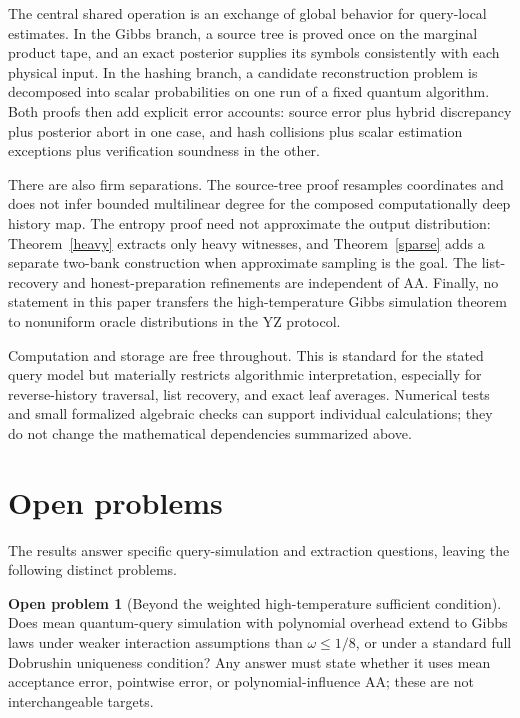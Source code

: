 \documentclass[11pt]{article}
\theoremstyle{definition}\newtheorem{definition}[theorem]{Definition}
\newtheorem{problem}[theorem]{Open problem}
\theoremstyle{remark}\newtheorem{remark}[theorem]{Remark}
\begin{document}
The central shared operation is an exchange of global behavior for query-local estimates. In the Gibbs branch, a source tree is proved once on the marginal product tape, and an exact posterior supplies its symbols consistently with each physical input. In the hashing branch, a candidate reconstruction problem is decomposed into scalar probabilities on one run of a fixed quantum algorithm. Both proofs then add explicit error accounts: source error plus hybrid discrepancy plus posterior abort in one case, and hash collisions plus scalar estimation exceptions plus verification soundness in the other.

There are also firm separations. The source-tree proof resamples coordinates and does not infer bounded multilinear degree for the composed computationally deep history map. The entropy proof need not approximate the output distribution: Theorem~\ref{heavy} extracts only heavy witnesses, and Theorem~\ref{sparse} adds a separate two-bank construction when approximate sampling is the goal. The list-recovery and honest-preparation refinements are independent of AA. Finally, no statement in this paper transfers the high-temperature Gibbs simulation theorem to nonuniform oracle distributions in the YZ protocol.

Computation and storage are free throughout. This is standard for the stated query model but materially restricts algorithmic interpretation, especially for reverse-history traversal, list recovery, and exact leaf averages. Numerical tests and small formalized algebraic checks can support individual calculations; they do not change the mathematical dependencies summarized above.

\section{Open problems}\label{sec:open}
The results answer specific query-simulation and extraction questions, leaving the following distinct problems.

\begin{problem}[Beyond the weighted high-temperature sufficient condition]
Does mean quantum-query simulation with polynomial overhead extend to Gibbs laws under weaker interaction assumptions than \(\omega\le1/8\), or under a standard full Dobrushin uniqueness condition? Any answer must state whether it uses mean acceptance error, pointwise error, or polynomial-influence AA; these are not interchangeable targets.
\end{problem}
\end{document}
